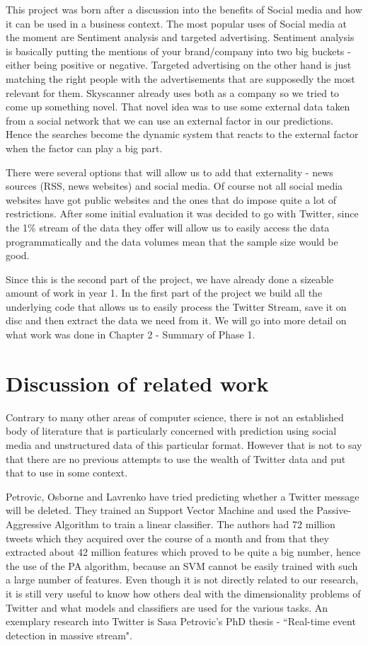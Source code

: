 \documentclass[minf,twoside,singlespacing,parskip,frontabs,notimes,12pt]{infthesis} %
\begin{document}
This project was born after a discussion into the benefits of Social media and how it can be used in a business context. The most popular uses of Social media at the moment are Sentiment analysis and targeted advertising. Sentiment analysis is basically putting the mentions of your brand/company into two big buckets - either being positive or negative. Targeted advertising on the other hand is just matching the right people with the advertisements that are supposedly the most relevant for them. Skyscanner already uses both as a company so we tried to come up something novel. That novel idea was to use some external data taken from a social network that we can use an external factor in our predictions. Hence the searches become the dynamic system that reacts to the external factor when the factor can play a big part. 

There were several options that will allow us to add that externality - news sources (RSS, news websites) and social media. Of course not all social media websites have got public websites and the ones that do impose quite a lot of restrictions. After some initial evaluation it was decided to go with Twitter, since the 1\% stream of the data they offer will allow us to easily access the data programmatically and the data volumes mean that the sample size would be good. 


Since this is the second part of the project, we have already done a sizeable amount of work in year 1. In the first part of the project we build all the underlying code that allows us to easily process the Twitter Stream, save it on disc and then extract the data we need from it. We will go into more detail on what work was done in Chapter 2 - Summary of Phase 1. 


\section{Discussion of related work}

Contrary to many other areas of computer science, there is not an established body of literature that is particularly concerned with prediction using social media and unstructured data of this particular format. However that is not to say that there are no previous attempts to use the wealth of Twitter data and put that to use in some context. 

Petrovic, Osborne and Lavrenko \cite{Miles2} have tried predicting whether a Twitter message will be deleted. They trained an Support Vector Machine and used the Passive-Aggressive Algorithm to train a linear classifier. The authors had 72 million tweets which they acquired over the course of a month and from that they extracted about 42 million features which proved to be quite a big number, hence the use of the PA algorithm, because an SVM cannot be easily trained with such a large number of features. Even though it is not directly related to our research, it is still very useful to know how others deal with the dimensionality problems of Twitter and what models and classifiers are used for the various tasks. An exemplary research into Twitter is Sasa Petrovic's PhD thesis - ``Real-time event detection in massive stream"\cite{Petrovic2012}.  
\end{document}
